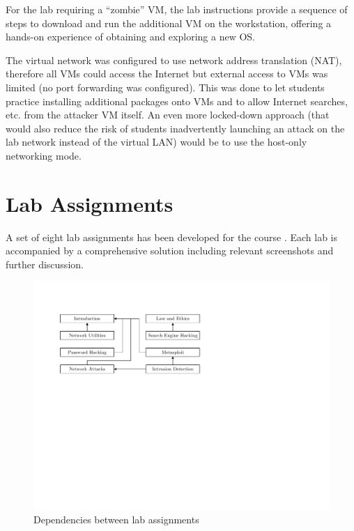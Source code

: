 \documentclass{sig-alternate-2013}
\begin{document}
For the lab requiring a ``zombie'' VM, the lab instructions provide a sequence of steps to download 
and run the additional VM on the workstation, offering a hands-on experience of obtaining and exploring a new OS.

The virtual network was configured to use network address translation (NAT), 
therefore all VMs could access the Internet but external access to VMs
was limited (no port forwarding was configured). This was done to let students practice installing additional packages
onto VMs and to allow Internet searches, etc. from the attacker VM itself.
An even more locked-down approach (that would also reduce the risk of students inadvertently launching an attack
on the lab network instead of the virtual LAN) would be to use the host-only networking mode.

\section{Lab Assignments}
A set of eight lab assignments has been developed for the course \cite{thelabs}. 
Each lab is accompanied by a comprehensive solution including relevant screenshots and further discussion.

\begin{figure}[b!]
\includegraphics[scale=0.6, clip=true, trim=0.85in 5in 4.5in 1.2in]{dependencies-between-labs.pdf}
\caption{Dependencies between lab assignments}
\label{fig:labdeps}
\end{figure}
\end{document}
